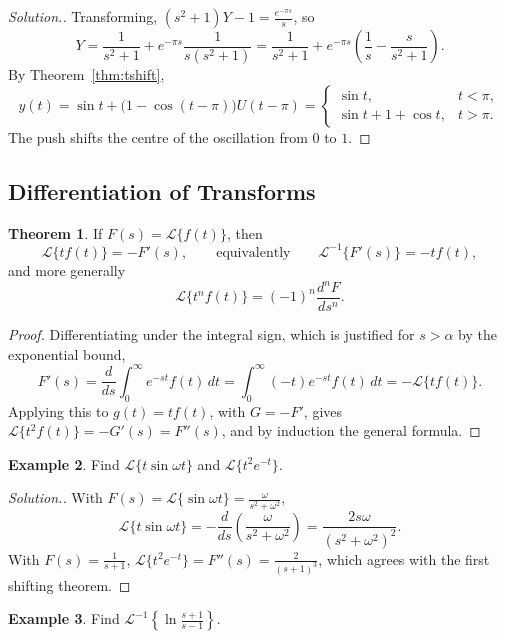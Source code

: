 \documentclass[11pt,a4paper]{article}
\theoremstyle{definition}
\newtheorem{thm}{Theorem}[subsection]
\newtheorem{exa}[thm]{Example}
\newenvironment{solution}
  {\renewcommand{\qedsymbol}{}\begin{proof}[\textit{Solution}.]}
  {\end{proof}}
\begin{document}
\begin{solution}
Transforming, $(s^2 + 1)Y - 1 = \frac{e^{-\pi s}}{s}$, so
\[Y = \frac{1}{s^2 + 1} + e^{-\pi s}\frac{1}{s(s^2 + 1)} = \frac{1}{s^2 + 1} +
e^{-\pi s}\left(\frac1s - \frac{s}{s^2 + 1}\right).\]
By Theorem~\ref{thm:tshift},
\[y(t) = \sin t + \big(1 - \cos(t - \pi)\big)U(t - \pi) =
\begin{cases}
\sin t, & t<\pi,\\
\sin t + 1 + \cos t, & t>\pi .
\end{cases}\]
The push shifts the centre of the oscillation from $0$ to $1$.
\end{solution}

{\color[wave]{485}\subsection{Differentiation of Transforms}}

\begin{thm}
\label{thm:lapdifftrans}
If $F(s) = \mathcal{L}\{f(t)\}$, then
\[\mathcal{L}\{t f(t)\} = -F'(s),\qquad\text{equivalently}\qquad
\mathcal{L}^{-1}\{F'(s)\} = -t f(t) ,\]
and more generally
\[\mathcal{L}\{t^n f(t)\} = (-1)^n \frac{d^n F}{d s^n} .\]
\end{thm}

\begin{proof}
Differentiating under the integral sign, which is justified for $s>\alpha$ by the
exponential bound,
\[F'(s) = \frac{d}{ds}\int_0^\infty e^{-st}f(t)\,dt = \int_0^\infty
(-t)e^{-st}f(t)\,dt = -\mathcal{L}\{tf(t)\} .\]
Applying this to $g(t) = tf(t)$, with $G = -F'$, gives
$\mathcal{L}\{t^2f(t)\} = -G'(s) = F''(s)$, and by induction the general formula.
\end{proof}

\begin{exa}
\label{ex:tsin}
Find $\mathcal{L}\{t \sin \omega t\}$ and $\mathcal{L}\{t^2e^{-t}\}$.
\end{exa}

\begin{solution}
With $F(s) = \mathcal{L}\{\sin \omega t\} = \frac{\omega}{s^2 + \omega^2}$,
\[\mathcal{L}\{t \sin \omega t\} = -\frac{d}{ds}\left(\frac{\omega}{s^2 +
\omega^2}\right) = \frac{2s\omega}{(s^2 + \omega^2)^2} .\]
With $F(s) = \frac{1}{s + 1}$, $\mathcal{L}\{t^2e^{-t}\} = F''(s) =
\frac{2}{(s+1)^3}$, which agrees with the first shifting theorem.
\end{solution}

\begin{exa}
\label{ex:lnfraction}
Find $\mathcal{L}^{-1}\left\{\ln\frac{s + 1}{s - 1}\right\}$.
\end{exa}
\end{document}
